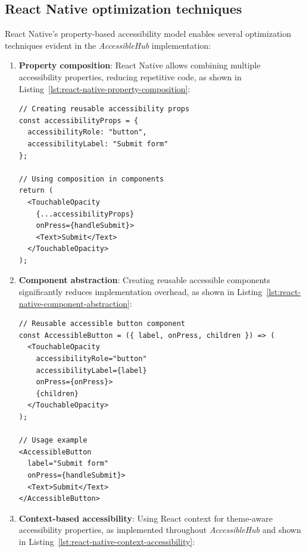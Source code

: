 \subsection{React Native optimization techniques}
\label{subsec:react-native-optimization}

React Native's property-based accessibility model enables several optimization techniques evident in the \textit{AccessibleHub} implementation:

\begin{enumerate}
    \item \textbf{Property composition}: React Native allows combining multiple accessibility properties, reducing repetitive code, as shown in Listing~\ref{lst:react-native-property-composition}:
    
    \begin{lstlisting}[style=ReactNativeStyle, caption=Property composition in React Native, label=lst:react-native-property-composition]
// Creating reusable accessibility props
const accessibilityProps = {
  accessibilityRole: "button",
  accessibilityLabel: "Submit form"
};

// Using composition in components
return (
  <TouchableOpacity
    {...accessibilityProps}
    onPress={handleSubmit}>
    <Text>Submit</Text>
  </TouchableOpacity>
);
    \end{lstlisting}

\pagebreak
    
    \item \textbf{Component abstraction}: Creating reusable accessible components significantly reduces implementation overhead, as shown in Listing~\ref{lst:react-native-component-abstraction}:
    
    \begin{lstlisting}[style=ReactNativeStyle, caption=Component abstraction in React Native, label=lst:react-native-component-abstraction]
// Reusable accessible button component
const AccessibleButton = ({ label, onPress, children }) => (
  <TouchableOpacity
    accessibilityRole="button"
    accessibilityLabel={label}
    onPress={onPress}>
    {children}
  </TouchableOpacity>
);

// Usage example
<AccessibleButton
  label="Submit form"
  onPress={handleSubmit}>
  <Text>Submit</Text>
</AccessibleButton>
    \end{lstlisting}
    
    \item \textbf{Context-based accessibility}: Using React context for theme-aware accessibility properties, as implemented throughout \textit{AccessibleHub} and shown in Listing~\ref{lst:react-native-context-accessibility}:
    

\end{enumerate}
